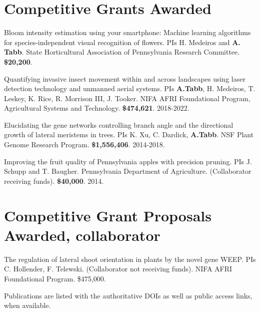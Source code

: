 \documentclass[letterpaper,11pt]{article}
\begin{document}
\section{Competitive Grants Awarded}
\begin{enumerate}[noitemsep, leftmargin=*,label={[G\arabic*]}]
\item{Bloom intensity estimation using your smartphone: Machine learning algorithms for species-independent visual recognition of flowers.  PIs H. Medeiros and \textbf{A. Tabb}.  State Horticultural Association of Pennsylvania Research Committee.  {\bf \$20,200}.}
\item{Quantifying invasive insect movement within and across landscapes using laser detection technology and unmanned aerial systems. PIs \textbf{A.Tabb}, H. Medeiros, T. Leskey, K. Rice, R. Morrison III, J. Tooker. NIFA AFRI Foundational Program, Agricultural Systems and Technology. {\bf\$474,621}. 2018-2022.}
\item{Elucidating the gene networks controlling branch angle and the directional growth of lateral meristems in trees.  PIs K. Xu, C. Dardick, \textbf{A.Tabb}. NSF Plant Genome Research Program. {\bf\$1,556,406}. 2014-2018.}
\item{Improving the fruit quality of Pennsylvania apples with precision pruning.  PIs J. Schupp and T. Baugher. Pennsylvania Department of Agriculture.  (Collaborator receiving funds). {\bf\$40,000}. 2014.}
\end{enumerate}

\section{\sc Competitive Grant Proposals Awarded, collaborator}
The regulation of lateral shoot orientation in plants by the novel gene WEEP. PIs C. Hollender, F. Telewski.  (Collaborator not receiving funds). NIFA AFRI Foundational Program. \$475,000.
\vspace*{0.5in}

Publications are listed with the authoritative DOIs as well as public access links, when available.
\end{document}

